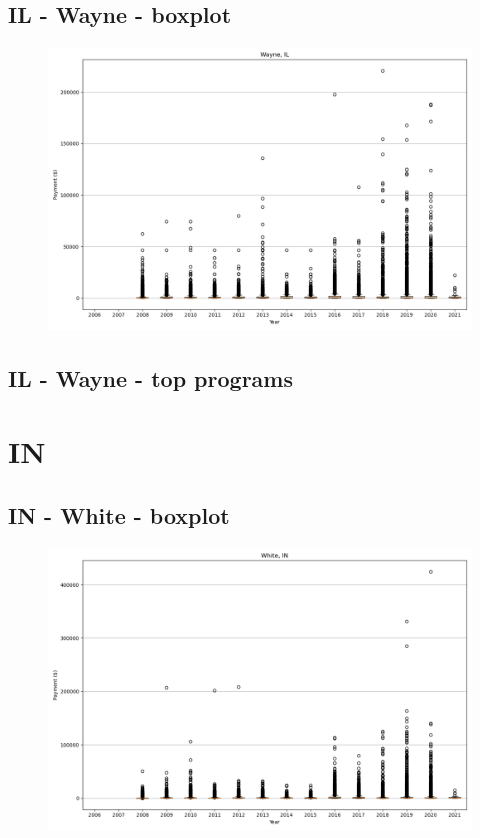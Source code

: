 \subsection*{IL - Wayne - boxplot}
\begin{figure}[h]
\centering
\includegraphics[width=7in]{../output/boxplots/counties/Wayne-IL_boxplot.png}
\end{figure}


\subsection*{IL - Wayne - top programs}

\newpage
\section*{IN}
\subsection*{IN - White - boxplot}
\begin{figure}[h]
\centering
\includegraphics[width=7in]{../output/boxplots/counties/White-IN_boxplot.png}
\end{figure}


